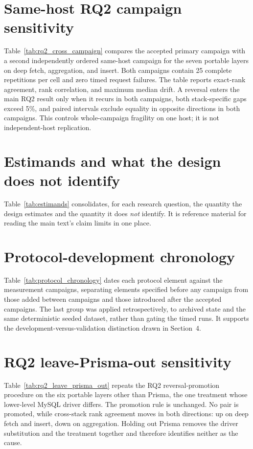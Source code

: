 \documentclass[11pt,a4paper]{article}
\newcommand{\tabledir}{tables/}
\begin{document}


\section{Same-host RQ2 campaign sensitivity}
\label{sup:rq2-cross-campaign}
Table~\ref{tab:rq2_cross_campaign} compares the accepted primary campaign with a second independently ordered same-host campaign for the seven portable layers on deep fetch, aggregation, and insert. Both campaigns contain 25 complete repetitions per cell and zero timed request failures. The table reports exact-rank agreement, rank correlation, and maximum median drift. A reversal enters the main RQ2 result only when it recurs in both campaigns, both stack-specific gaps exceed 5\%, and paired intervals exclude equality in opposite directions in both campaigns. This controls whole-campaign fragility on one host; it is not independent-host replication.



\section{Estimands and what the design does not identify}
\label{sup:estimands}
Table~\ref{tab:estimands} consolidates, for each research question, the quantity the design
estimates and the quantity it does \emph{not} identify. It is reference material for reading the
main text's claim limits in one place.



\section{Protocol-development chronology}
\label{sup:protocol-chronology}
Table~\ref{tab:protocol_chronology} dates each protocol element against the measurement
campaigns, separating elements specified before any campaign from those added between campaigns
and those introduced after the accepted campaigns. The last group was applied retrospectively, to
archived state and the same deterministic seeded dataset, rather than gating the timed runs.
It supports the development-versus-validation distinction drawn in Section~4.



\section{RQ2 leave-Prisma-out sensitivity}
\label{sup:rq2-leave-prisma-out}
Table~\ref{tab:rq2_leave_prisma_out} repeats the RQ2 reversal-promotion procedure on the six
portable layers other than Prisma, the one treatment whose lower-level MySQL driver differs. The
promotion rule is unchanged. No pair is promoted, while cross-stack rank agreement moves in both
directions: up on deep fetch and insert, down on aggregation. Holding out Prisma removes the driver substitution and the
treatment together and therefore identifies neither as the cause.
\end{document}

